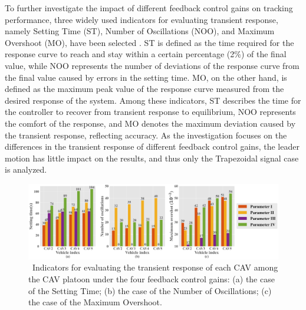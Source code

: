 \documentclass[a4paper]{cas-sc}
\begin{document}
To further investigate the impact of different feedback control gains on tracking performance, three widely used indicators for evaluating transient response, namely Setting Time (ST), Number of Oscillations (NOO), and Maximum Overshoot (MO), have been selected  \citep{ogata1995discrete}. ST is defined as the time required for the response curve to reach and stay within a certain percentage (2\%) of the final value, while NOO represents the number of deviations of the response curve from the final value caused by errors in the setting time. MO, on the other hand, is defined as the maximum peak value of the response curve measured from the desired response of the system. Among these indicators, ST describes the time for the controller to recover from transient response to equilibrium, NOO represents the comfort of the response, and MO denotes the maximum deviation caused by the transient response, reflecting accuracy. As the investigation focuses on the differences in the transient response of different feedback control gains, the leader motion has little impact on the results, and thus only the Trapezoidal signal case is analyzed.

\begin{figure}
  \centering
  \includegraphics[width=16cm]{figs/fig6.png}
  \caption{~Indicators for evaluating the transient response of each CAV among the CAV platoon under the four feedback control gains: (a) the case of the Setting Time; (b) the case of the Number of Oscillations; (c) the case of the Maximum Overshoot.}
  \label{fig6}
\end{figure}
\end{document}
